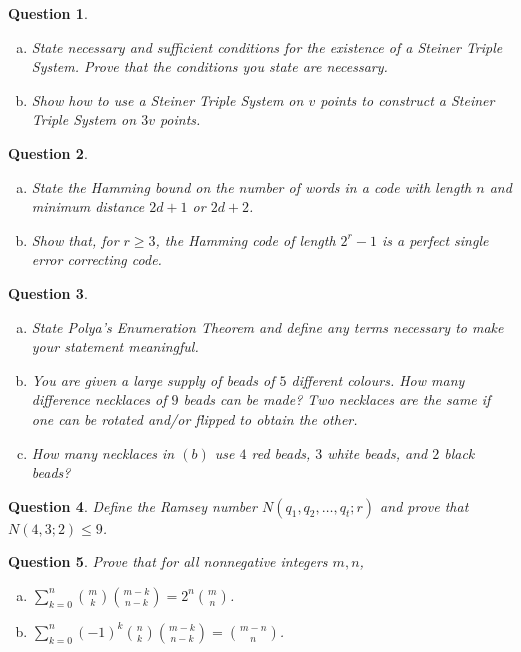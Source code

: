 \documentclass[12]{article}
\newtheorem{question}{Question}
\theoremstyle{definition}
\begin{document}
	\begin{question}
		\
		\begin{enumerate}[a)]
			\item State necessary and sufficient conditions for the existence of a Steiner Triple System.  Prove that the conditions you state are necessary.
			\item Show how to use a Steiner Triple System on $v$ points to construct a Steiner Triple System on $3v$ points.
		\end{enumerate}
	\end{question}

	\begin{question}
		\
		\begin{enumerate}[a)]
			\item State the Hamming bound on the number of words in a code with length $n$ and minimum distance $2d+1$ or $2d+2$.
			\item Show that, for $r \geq 3$, the Hamming code of length $2^r-1$ is a perfect single error correcting code.
		\end{enumerate}
	\end{question}

	\begin{question}
		\
		\begin{enumerate}[a)]
			\item State Polya's Enumeration Theorem and define any terms necessary to make your statement meaningful.
			\item You are given a large supply of beads of $5$ different colours.  How many difference necklaces of $9$ beads can be made?  Two necklaces are the same if one can be rotated and/or flipped to obtain the other.
			\item How many necklaces in $(b)$ use $4$ red beads, $3$ white beads, and $2$ black beads?
		\end{enumerate}
	\end{question}

	\newpage
	
	\begin{question}
		Define the Ramsey number $N(q_1, q_2, \ldots, q_t;r)$ and prove that $N(4,3;2) \leq 9$.
	\end{question}
	\begin{question}
		Prove that for all nonnegative integers $m, n$,
		\begin{enumerate}[a)]
			\item $\sum_{k=0}^n  {m \choose k}{m-k \choose n-k} = 2^n{m \choose n}$.
			
			\item $\sum_{k=0}^n (-1)^k {n \choose k} {m-k \choose n-k} = {m - n \choose n}$.
		\end{enumerate}
	\end{question}
\end{document}
